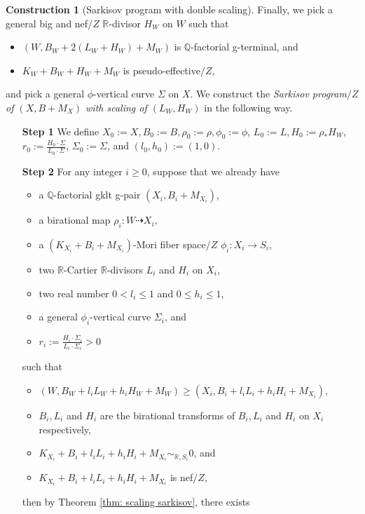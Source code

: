 \documentclass[11pt]{amsart}
\numberwithin{equation}{section}
\newcommand{\Qq}{\mathbb{Q}}
\newcommand{\Rr}{\mathbb{R}}
\theoremstyle{definition}
\newtheorem{cons}[thm]{Construction}
\theoremstyle{remark}
\theoremstyle{definition}
\begin{document}
\begin{cons}[Sarkisov program with double scaling]
 Finally, we pick a general big and nef$/Z$ $\Rr$-divisor $H_W$ on $W$ such that
\begin{itemize}
\item $(W,B_W+2(L_W+H_W)+M_W)$ is $\Qq$-factorial g-terminal, and
    \item $K_W+B_W+H_W+M_W$ is pseudo-effective$/Z$, 
\end{itemize}
and pick a general $\phi$-vertical curve $\Sigma$ on $X$. We construct the \emph{Sarkisov program$/Z$ of $(X,B+M_{X})$ with scaling of $(L_W,H_W)$} in the following way. 
\begin{itemize}
    \item[\textbf{Step 1}] We define $X_0:=X,B_0:=B,\rho_0:=\rho,\phi_0:=\phi$, $L_0:=L, H_0:=\rho_*H_W$, $r_0:=\frac{H_0\cdot\Sigma}{L_0\cdot\Sigma}$, $\Sigma_0:=\Sigma$, and $(l_0,h_0):=(1,0)$.
    \item[\textbf{Step 2}] For any integer $i\geq 0$, suppose that we already have
    \begin{itemize}
        \item a $\Qq$-factorial gklt g-pair $(X_i,B_i+M_{X_i})$,
        \item a birational map $\rho_i: W\dashrightarrow X_i$,
        \item a $(K_{X_i}+B_i+M_{X_i})$-Mori fiber space$/Z$ $\phi_i: X_i\rightarrow S_i$,
        \item two $\Rr$-Cartier $\Rr$-divisors $L_i$ and $H_i$ on $X_i$, 
            \item two real number $0<l_i\leq 1$ and $0\leq h_i\leq 1$, 
            \item a general $\phi_i$-vertical curve $\Sigma_i$, and
            \item $r_i:=\frac{H_i\cdot\Sigma_i}{L_i\cdot\Sigma_i}>0$
    \end{itemize}
    such that
    \begin{itemize}
        \item $(W,B_W+l_iL_W+h_iH_W+M_W)\geq (X_i,B_i+l_iL_i+h_iH_i+M_{X_i})$,
        \item $B_i,L_i$ and $H_i$ are the birational transforms of $B_i,L_i$ and $H_i$ on $X_i$ respectively,
        \item $K_{X_i}+B_i+l_iL_i+h_iH_i+M_{X_i}\sim_{\Rr,S_i}0$, and
        \item $K_{X_i}+B_i+l_iL_i+h_iH_i+M_{X_i}$ is nef$/Z$,
    \end{itemize}
    then by Theorem \ref{thm: scaling sarkisov}, there exists 
    \begin{itemize}

\end{itemize}
\end{itemize}
\end{cons}
\end{document}
